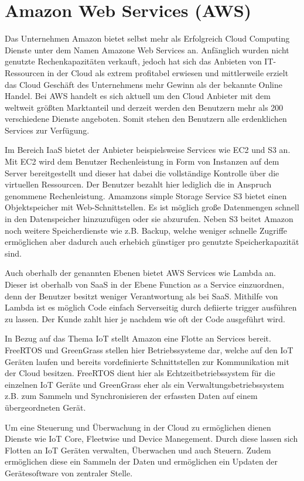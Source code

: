 \chapter{Amazon Web Services (AWS)}\label{ch:4}

Das Unternehmen Amazon bietet selbst mehr als Erfolgreich Cloud Computing Dienste unter dem Namen Amazone Web Services an. Anfänglich wurden nicht genutzte Rechenkapazitäten verkauft, jedoch hat sich das Anbieten von IT-Ressourcen in der Cloud als extrem profitabel erwiesen und mittlerweile erzielt das Cloud Geschäft des Unternehmens mehr Gewinn als der bekannte Online Handel. Bei AWS handelt es sich aktuell um den Cloud Anbieter mit dem weltweit größten Marktanteil und derzeit werden den Benutzern mehr als 200 verschiedene Dienste angeboten. Somit stehen den Benutzern alle erdenklichen Services zur Verfügung\cite*[]{AMA1}.

Im Bereich IaaS bietet der Anbieter beispielsweise Services wie EC2 und S3 an. Mit EC2 wird dem Benutzer Rechenleistung in Form von Instanzen auf dem Server bereitgestellt und dieser hat dabei die vollständige Kontrolle über die virtuellen Ressourcen. Der Benutzer bezahlt hier lediglich die in Anspruch genommene Rechenleistung. Amamzons simple Storage Service S3 bietet einen Objektspeicher mit Web-Schnittstellen. Es ist möglich große Datenmengen schnell in den Datenspeicher hinzuzufügen oder sie abzurufen. Neben S3 beitet Amazon noch weitere Speicherdienste wie z.B. Backup, welche weniger schnelle Zugriffe ermöglichen aber dadurch auch erhebich günstiger pro genutzte Speicherkapazität sind.

Auch oberhalb der genannten Ebenen bietet AWS Services wie Lambda an. Dieser ist oberhalb von SaaS in der Ebene Function as a Service einzuordnen, denn der Benutzer besitzt weniger Verantwortung als bei SaaS. Mithilfe von Lambda ist es möglich Code einfach Serverseitig durch defiierte trigger ausführen zu lassen. Der Kunde zahlt hier je nachdem wie oft der Code ausgeführt wird.

In Bezug auf das Thema IoT stellt Amazon eine Flotte an Services bereit. FreeRTOS und GreenGrass stellen hier Betriebssysteme dar, welche auf den IoT Geräten laufen und bereits vordefinierte Schnittstellen zur Kommunikation mit der Cloud besitzen. FreeRTOS dient hier als Echtzeitbetriebssystem für die einzelnen IoT Geräte und GreenGrass eher als ein Verwaltungsbetriebssystem z.B. zum Sammeln und Synchronisieren der erfassten Daten auf einem übergeordneten Gerät.

Um eine Steuerung und Überwachung in der Cloud zu ermöglichen dienen Dienste wie IoT Core, Fleetwise und Device Manegement. Durch diese lassen sich Flotten an IoT Geräten verwalten, Überwachen und auch Steuern. Zudem ermöglichen diese ein Sammeln der Daten und ermöglichen ein Updaten der Gerätesoftware von zentraler Stelle.

